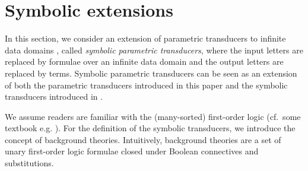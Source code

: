 
\section{Symbolic extensions}
\label{sec:symbolic}


In this section, we consider an extension of parametric transducers to infinite data domains , called \emph{symbolic parametric transducers}, where the input letters are replaced by formulae over an infinite data domain and the output letters are replaced by terms. 
%
Symbolic parametric transducers can be seen as an extension of both the parametric transducers introduced in this paper and the symbolic transducers introduced in \cite{VHLMB12}.

We assume readers are familiar with the (many-sorted) first-order logic (cf.\ some textbook e.g. \cite{EFT94}).
For the definition of the symbolic transducers, we introduce the concept of background theories.
 Intuitively, background theories are a set of unary first-order logic formulae closed under Boolean connectives and substitutions. 

